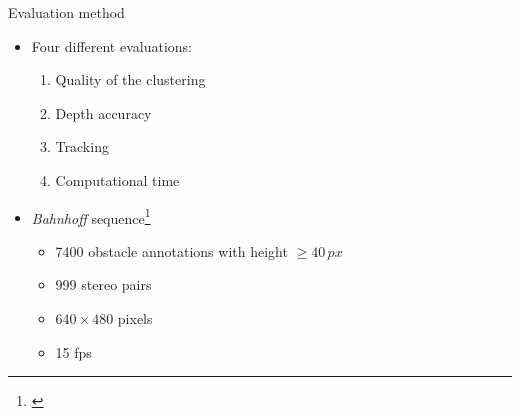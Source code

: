 \begin{frame}{Evaluation method}
\begin{itemize}
    \item Four different evaluations:
    \begin{enumerate}
      \item Quality of the clustering
      \item Depth accuracy
      \item Tracking
      \item Computational time
    \end{enumerate}
    \item \emph{Bahnhoff} sequence\footnote{\cite{ess2009robust}}
    \begin{itemize}
	\item 7400 obstacle annotations with height $\geq 40\,px$
	\item 999 stereo pairs
	\item $640 \times 480$ pixels
	\item 15 fps
    \end{itemize}
\end{itemize}

\end{frame}

